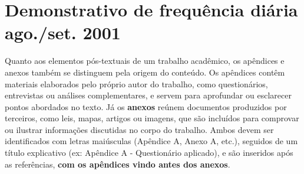 {\let\clearpage\relax \chapter{\textbf{Demonstrativo de
frequência diária ago./set. 2001}}}

Quanto aos elementos pós-textuais de um trabalho acadêmico, os apêndices e anexos também se distinguem pela origem do conteúdo. Os apêndices contêm materiais elaborados pelo próprio autor do trabalho, como questionários, entrevistas ou análises complementares, e servem para aprofundar ou esclarecer pontos abordados no texto. Já os \textbf{anexos} reúnem documentos produzidos por terceiros, como leis, mapas, artigos ou imagens, que são incluídos para comprovar ou ilustrar informações discutidas no corpo do trabalho. Ambos devem ser identificados com letras maiúsculas (Apêndice A, Anexo A, etc.), seguidos de um título explicativo (ex: Apêndice A - Questionário aplicado), e são inseridos após as referências, \textbf{com os apêndices vindo antes dos anexos}.\\